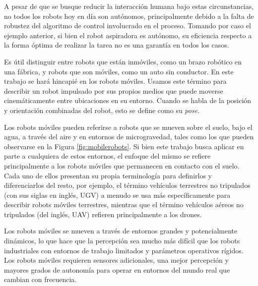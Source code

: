 A pesar de que se busque reducir la interacción humana bajo estas circunstancias, no todos los robots hoy en día son autónomos, principalmente debido a la falta de robustez del algoritmo de control involucrado en el proceso. Tomando por caso el ejemplo anterior, si bien el robot aspiradora es autónomo, su eficiencia respecto a la forma óptima de realizar la tarea no es una garantía en todos los casos.

Es útil distinguir entre robots que están inmóviles, como un brazo robótico en una fábrica, y robots que son móviles, como un auto sin conductor. En este trabajo se hará hincapié en los robots móviles. Usamos este término para describir un robot impulsado por sus propios medios que puede moverse cinemáticamente entre ubicaciones en su entorno. Cuando se habla de la posición y orientación combinadas del robot, esto se define como su \textit{pose}.

Los robots móviles pueden referirse a robots que se mueven sobre el suelo, bajo el agua, a través del aire y en entornos de microgravedad, tales como los que pueden observarse en la Figura \ref{fig:mobilerobots}. Si bien este trabajo busca aplicar en parte a cualquiera de estos entornos, el enfoque del mismo se refiere principalmente a los robots móviles que permanecen en contacto con el suelo. Cada uno de ellos presentan su propia terminología para definirlos y diferenciarlos del resto, por ejemplo, el término vehículos terrestres no tripulados (con sus siglas en inglés, UGV) a menudo se usa más específicamente para describir robots móviles terrestres, mientras que el término vehículos aéreos no tripulados (del inglés, UAV) refieren principalmente a los drones.

Los robots móviles se mueven a través de entornos grandes y potencialmente dinámicos, lo que hace que la percepción sea mucho más difícil que los robots industriales con entornos de trabajo limitados y parámetros operativos rígidos. Los robots móviles requieren sensores adicionales, una mejor percepción y mayores grados de autonomía para operar en entornos del mundo real que cambian con frecuencia.


